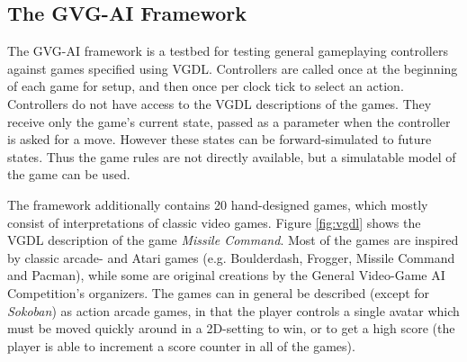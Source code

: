 \documentclass[a4paper,titlepage,final, twoside]{report}
\begin{document}
\subsection{The GVG-AI Framework}

The GVG-AI framework is a testbed for testing general gameplaying controllers against games specified using VGDL. Controllers are called once at the beginning of each game for setup, and then once per clock tick to select an action. Controllers do not have access to the VGDL descriptions of the games. They receive only the game's current state, passed as a parameter when the controller is asked for a move. However these states can be forward-simulated to future states. Thus the game rules are not directly available, but a simulatable model of the game can be used.

The framework additionally contains 20 hand-designed games, which mostly consist of interpretations of classic video games. Figure \ref{fig:vgdl} shows the VGDL description of the game \emph{Missile Command}.
Most of the games are inspired by classic arcade- and Atari games (e.g. Boulderdash, Frogger, Missile Command and Pacman), while some are original creations by the General Video-Game AI Competition's organizers. 
The games can in general be described (except for \emph{Sokoban}) as action arcade games, in that the player controls a single avatar which must be moved quickly around in a 2D-setting to win, or to get a high score (the player is able to increment a score  counter in all of the games).
\end{document}
